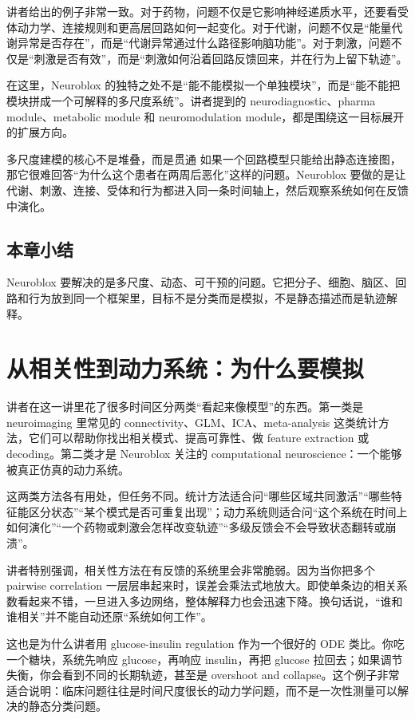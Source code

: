 \documentclass[a4paper]{article}
\begin{document}
讲者给出的例子非常一致。对于药物，问题不仅是它影响神经递质水平，还要看受体动力学、连接规则和更高层回路如何一起变化。对于代谢，问题不仅是“能量代谢异常是否存在”，而是“代谢异常通过什么路径影响脑功能”。对于刺激，问题不仅是“刺激是否有效”，而是“刺激如何沿着回路反馈回来，并在行为上留下轨迹”。

在这里，Neuroblox 的独特之处不是“能不能模拟一个单独模块”，而是“能不能把模块拼成一个可解释的多尺度系统”。讲者提到的 neurodiagnostic、pharma module、metabolic module 和 neuromodulation module，都是围绕这一目标展开的扩展方向。

\begin{importantbox}{多尺度建模的核心不是堆叠，而是贯通}
如果一个回路模型只能给出静态连接图，那它很难回答“为什么这个患者在两周后恶化”这样的问题。Neuroblox 要做的是让代谢、刺激、连接、受体和行为都进入同一条时间轴上，然后观察系统如何在反馈中演化。
\end{importantbox}

\subsection{本章小结}
Neuroblox 要解决的是多尺度、动态、可干预的问题。它把分子、细胞、脑区、回路和行为放到同一个框架里，目标不是分类而是模拟，不是静态描述而是轨迹解释。

\section{从相关性到动力系统：为什么要模拟}
讲者在这一讲里花了很多时间区分两类“看起来像模型”的东西。第一类是 neuroimaging 里常见的 connectivity、GLM、ICA、meta-analysis 这类统计方法，它们可以帮助你找出相关模式、提高可靠性、做 feature extraction 或 decoding。第二类才是 Neuroblox 关注的 computational neuroscience：一个能够被真正仿真的动力系统。

这两类方法各有用处，但任务不同。统计方法适合问“哪些区域共同激活”“哪些特征能区分状态”“某个模式是否可重复出现”；动力系统则适合问“这个系统在时间上如何演化”“一个药物或刺激会怎样改变轨迹”“多级反馈会不会导致状态翻转或崩溃”。

讲者特别强调，相关性方法在有反馈的系统里会非常脆弱。因为当你把多个 pairwise correlation 一层层串起来时，误差会乘法式地放大。即使单条边的相关系数看起来不错，一旦进入多边网络，整体解释力也会迅速下降。换句话说，“谁和谁相关”并不能自动还原“系统如何工作”。

这也是为什么讲者用 glucose-insulin regulation 作为一个很好的 ODE 类比。你吃一个糖块，系统先响应 glucose，再响应 insulin，再把 glucose 拉回去；如果调节失衡，你会看到不同的长期轨迹，甚至是 overshoot and collapse。这个例子非常适合说明：临床问题往往是时间尺度很长的动力学问题，而不是一次性测量可以解决的静态分类问题。
\end{document}
